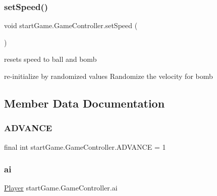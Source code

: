 \subsubsection{\texorpdfstring{set\+Speed()}{setSpeed()}}
{\footnotesize\ttfamily void start\+Game.\+Game\+Controller.\+set\+Speed (\begin{DoxyParamCaption}{ }\end{DoxyParamCaption})\hspace{0.3cm}{\ttfamily [private]}}



resets speed to ball and bomb 

re-\/initialize by randomized values Randomize the velocity for bomb

\subsection{Member Data Documentation}
\hypertarget{classstart_game_1_1_game_controller_a36c6fcecafa6f7176733248a5cfb2c87}{}\label{classstart_game_1_1_game_controller_a36c6fcecafa6f7176733248a5cfb2c87} 
\subsubsection{\texorpdfstring{A\+D\+V\+A\+N\+CE}{ADVANCE}}
{\footnotesize\ttfamily final int start\+Game.\+Game\+Controller.\+A\+D\+V\+A\+N\+CE = 1\hspace{0.3cm}{\ttfamily [private]}}

\hypertarget{classstart_game_1_1_game_controller_a21dfca701ec83511ac399a184530fc63}{}\label{classstart_game_1_1_game_controller_a21dfca701ec83511ac399a184530fc63} 
\subsubsection{\texorpdfstring{ai}{ai}}
{\footnotesize\ttfamily \hyperlink{classmodel_1_1_player}{Player} start\+Game.\+Game\+Controller.\+ai\hspace{0.3cm}{\ttfamily [private]}}

\hypertarget{classstart_game_1_1_game_controller_a402855c8c84c77218045cc997a784693}{}\label{classstart_game_1_1_game_controller_a402855c8c84c77218045cc997a784693} 
